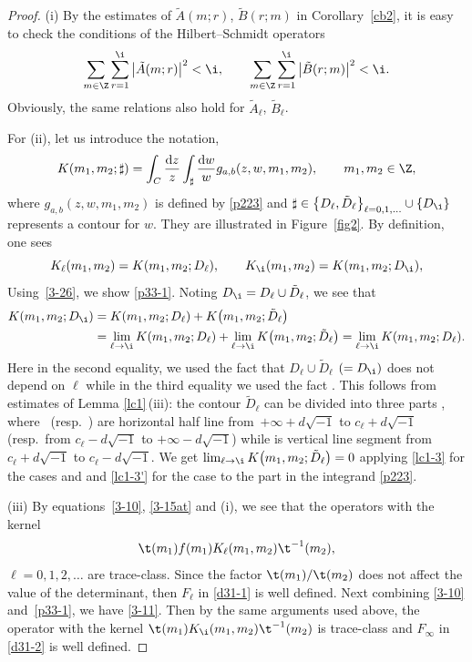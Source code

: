 \begin{proof}
 (i) By the estimates of $\tilde{A}(m;r)$, $\tilde{B}(r;m)$ in Corollary~\ref{cb2},
 it is easy to check
 the conditions of the Hilbert--Schmidt operators
\[
 \sum_{m\in\Z}\sum_{r=1}^{\i}\big|\tilde{A}(m;r)\big|^2<\i,
 \qquad
 \sum_{m\in\Z}\sum_{r=1}^{\i}\big|\tilde{B}(r;m)\big|^2<\i.
\]
Obviously, the same relations also hold for $\tilde{A}_{\ell}$, $\tilde{B}_{\ell}$.

 For (ii), let us introduce the notation,
\begin{align}
\label{3-26}
 K(m_1,m_2;\sharp)=
 \int_C\frac{{\rm d}z}{z}
 \int_{\sharp}\frac{{\rm d}w}{w}
 g_{a,b}(z,w,m_1,m_2), \qquad m_1,m_2\in\Z,
\end{align}
 where $g_{a,b}(z,w,m_1,m_2)$ is defined by \eqref{p223} and $\sharp\in\big\{D_{\ell}, \tilde{D}_{\ell}\big\}_{\ell=0,1,\dots}\cup\{D_{\i}\}$ represents a contour for $w$. They are illustrated in Figure~\ref{fig2}. By definition, one sees
\[%
 K_\ell(m_1,m_2)=K(m_1,m_2;D_\ell),\qquad
 K_{\i}(m_1,m_2)= K(m_1,m_2;D_\i),
\]
Using~\eqref{3-26}, we show \eqref{p33-1}.
 Noting $D_{\i}=D_\ell\cup\tilde{D}_\ell$, we see that
\begin{align*}%
 K(m_1,m_2;D_{\i})
 &=
 K(m_1,m_2;D_\ell)+ K\big(m_1,m_2;\tilde{D}_\ell\big)
 \\
 &=
 \lim_{\ell\rightarrow\i}K(m_1,m_2;D_\ell)
 +
 \lim_{\ell\rightarrow\i}K\big(m_1,m_2;\tilde{D}_\ell\big)
 =\lim_{\ell\rightarrow\i}K(m_1,m_2;D_\ell).
\end{align*}
 Here in the second equality, we used the
 fact that $D_\ell\cup\tilde{D}_\ell$ $(=D_{\i})$
 does not depend on $\ell$ while in the third equality we used the
 fact . This follows from estimates of Lemma \ref{lc1}\,(iii): the contour $\tilde{D}_\ell$ can be divided into three
 parts , where~ \big(resp.\ \big) are horizontal half line from~${+\infty+ d\sqrt{-1}}$ to $c_{\ell}+d\sqrt{-1}$ (resp.\ from $c_{\ell}-d\sqrt{-1}$ to $+\infty-d\sqrt{-1}$) while  is vertical line segment from $c_{\ell}+d\sqrt{-1}$ to $c_{\ell}-d\sqrt{-1}$. We get $\lim_{\ell\rightarrow\i}K\big(m_1,m_2;\tilde{D}_\ell\big)=0$ applying \eqref{lc1-3} for the cases  and  and \eqref{lc1-3'} for the case  to the part  in the integrand \eqref{p223}.

(iii)
 By equations~\eqref{3-10}, \eqref{3-15at} and (i), we see that the operators with the kernel
 \[\t(m_1)f(m_1) K_\ell(m_1,m_2)\t^{-1}(m_2),\]
 $\ell=0,1,2,\dots$ are trace-class. Since the factor $\t(m_1)/\t(m_2)$ does not affect the value of the determinant, then $F_\ell$ in \eqref{d31-1} is well defined.
 Next combining \eqref{3-10} and~\eqref{p33-1}, we have \eqref{3-11}. Then by the same arguments used above, the operator with the kernel $\t(m_1)K_\i (m_1,m_2)\t^{-1}(m_2)$ is trace-class and $F_\infty$ in \eqref{d31-2} is well defined.
\end{proof}

